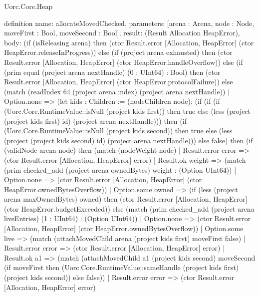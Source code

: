 \begin{lexlean}{Uorc.Core.Heap}
\begin{semanticmodule}
definition{
  name: allocateMovedChecked,
  parameters: [arena : Arena, node : Node, moveFirst : Bool, moveSecond : Bool],
  result: (Result Allocation HeapError),
  body: (if (isReleasing arena) then (ctor Result.error [Allocation, HeapError] (ctor HeapError.releaseInProgress)) else (if (project arena exhausted) then (ctor Result.error [Allocation, HeapError] (ctor HeapError.handleOverflow)) else (if (prim equal (project arena nextHandle) (0 : UInt64) : Bool) then (ctor Result.error [Allocation, HeapError] (ctor HeapError.protocolFailure)) else (match (readIndex 64 (project arena index) (project arena nextHandle))
    | Option.none => (let kids : Children := (nodeChildren node); (if (if (if (Uorc.Core.RuntimeValue::isNull (project kids first)) then true else (less (project (project kids first) id) (project arena nextHandle))) then (if (Uorc.Core.RuntimeValue::isNull (project kids second)) then true else (less (project (project kids second) id) (project arena nextHandle))) else false) then (if (validNode arena node) then (match (nodeWeight node)
      | Result.error error => (ctor Result.error [Allocation, HeapError] error)
      | Result.ok weight => (match (prim checked_add (project arena ownedBytes) weight : (Option UInt64))
        | Option.none => (ctor Result.error [Allocation, HeapError] (ctor HeapError.ownedBytesOverflow))
        | Option.some owned => (if (less (project arena maxOwnedBytes) owned) then (ctor Result.error [Allocation, HeapError] (ctor HeapError.budgetExceeded)) else (match (prim checked_add (project arena liveEntries) (1 : UInt64) : (Option UInt64))
          | Option.none => (ctor Result.error [Allocation, HeapError] (ctor HeapError.ownedBytesOverflow))
          | Option.some live => (match (attachMovedChild arena (project kids first) moveFirst false)
            | Result.error error => (ctor Result.error [Allocation, HeapError] error)
            | Result.ok a1 => (match (attachMovedChild a1 (project kids second) moveSecond (if moveFirst then (Uorc.Core.RuntimeValue::sameHandle (project kids first) (project kids second)) else false))
              | Result.error error => (ctor Result.error [Allocation, HeapError] error)
}
\end{semanticmodule}
\end{lexlean}
